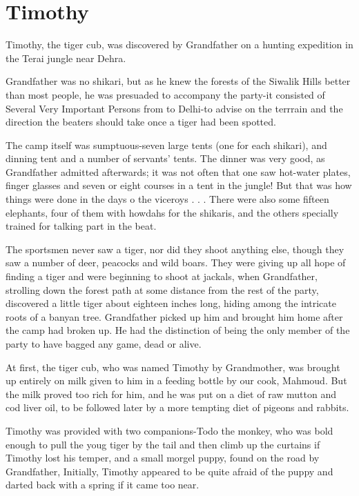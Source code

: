 \chapter{Timothy}
Timothy, the tiger cub, was discovered by Grandfather on a hunting expedition in the Terai jungle near Dehra.
\par
Grandfather was no shikari, but as he knew the forests of the Siwalik Hills better than most people, he was presuaded to accompany the party-it consisted of Several Very Important Persons from to Delhi-to advise on the terrrain and the direction the beaters should take once a tiger had been spotted.
\par
The camp itself was sumptuous-seven large tents (one for each shikari), and dinning tent and a number of servants' tents. The dinner was very good, as Grandfather admitted afterwards; it was not often that one saw hot-water plates, finger glasses and seven or eight courses in a tent in the jungle! But that was how things were done in the days o the viceroys . . . There were also some fifteen elephants, four of them with howdahs for the shikaris, and the others specially trained for talking part in the beat.
\par
The sportsmen never saw a tiger, nor did they shoot anything else, though they saw a number of deer, peacocks and wild boars. They were giving up all hope of finding a tiger and were beginning to shoot at jackals, when Grandfather, strolling down the forest path at some distance from the rest of the party, discovered a little tiger about eighteen inches long, hiding among the intricate roots of a banyan tree. Grandfather picked up him and brought him home after the camp had broken up. He had the distinction of being the only member of the party to have bagged any game, dead or alive.
\par
At first, the tiger cub, who was named Timothy by Grandmother, was brought up entirely on milk given to him in a feeding bottle by our cook, Mahmoud. But the milk proved too rich for him, and he was put on a diet of raw mutton and cod liver oil, to be followed later by a more tempting diet of pigeons and rabbits.
\par
Timothy was provided with two companions-Todo the monkey, who was bold enough to pull the youg tiger by the tail and then climb up the curtains if Timothy lost his temper, and a small morgel puppy, found on the road by Grandfather, Initially, Timothy appeared to be quite afraid of the puppy and darted back with a spring if it came too near.
\par
